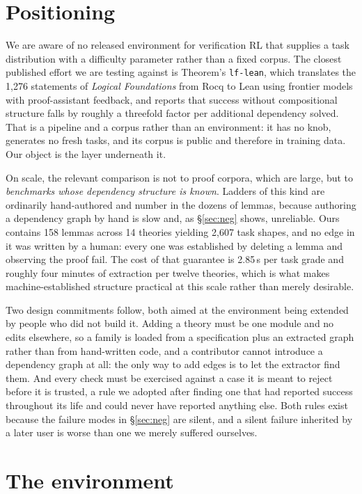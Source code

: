 \documentclass[10pt]{article}
\begin{document}
\section{Positioning}

We are aware of no released environment for verification RL that supplies a
task distribution with a difficulty parameter rather than a fixed corpus. The
closest published effort we are testing against is Theorem's \texttt{lf-lean},
which translates the 1{,}276 statements of \emph{Logical Foundations} from Rocq
to Lean using frontier models with proof-assistant feedback, and reports that
success without compositional structure falls by roughly a threefold factor per
additional dependency solved. That is a pipeline and a corpus rather than an
environment: it has no knob, generates no fresh tasks, and its corpus is public
and therefore in training data. Our object is the layer underneath it.

On scale, the relevant comparison is not to proof corpora, which are large, but
to \emph{benchmarks whose dependency structure is known}. Ladders of this kind
are ordinarily hand-authored and number in the dozens of lemmas, because
authoring a dependency graph by hand is slow and, as \S\ref{sec:neg} shows,
unreliable. Ours contains 158 lemmas across 14 theories yielding 2{,}607 task
shapes, and no edge in it was written by a human: every one was established by
deleting a lemma and observing the proof fail. The cost of that guarantee is
2.85\,s per task grade and roughly four minutes of extraction per twelve
theories, which is what makes machine-established structure practical at this
scale rather than merely desirable.

Two design commitments follow, both aimed at the environment being extended by
people who did not build it. Adding a theory must be one module and no edits
elsewhere, so a family is loaded from a specification plus an extracted graph
rather than from hand-written code, and a contributor cannot introduce a
dependency graph at all: the only way to add edges is to let the extractor find
them. And every check must be exercised against a case it is meant to reject
before it is trusted, a rule we adopted after finding one that had reported
success throughout its life and could never have reported anything else. Both
rules exist because the failure modes in \S\ref{sec:neg} are silent, and a
silent failure inherited by a later user is worse than one we merely suffered
ourselves.

\section{The environment}
\label{sec:env}
\end{document}
